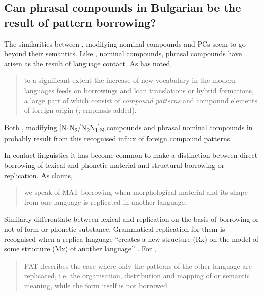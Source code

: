\documentclass[output=paper]{LSP/langsci}
\begin{document}
\subsection{Can phrasal compounds in Bulgarian be the result of pattern borrowing?}\label{sec:bagasheva:5.2}


The similarities between , modifying nominal compounds and PCs seem to go beyond their semantics. Like , nominal compounds, phrasal compounds have arisen as the result of language contact. As \citet[1856]{Ohnheiser2015} has noted,

\begin{quotation}
to a significant extent the increase of new vocabulary in the modern  languages feeds on borrowings and loan translations or hybrid formations, a large part of which consist of \textit{compound patterns} and compound elements of foreign origin (\citealt[1856]{Ohnheiser2015}; emphasis added).
\end{quotation}


Both , modifying [N\textsubscript{1}N\textsubscript{2}/N\textsubscript{2}N\textsubscript{1}]\textsubscript{N} compounds and phrasal nominal compounds in  probably result from this recognised influx of foreign compound patterns. 

In contact linguistics it has become common to make a distinction between direct borrowing of lexical and phonetic material and structural borrowing or  replication. As \citet[15]{Sakel2007}  claims, \begin{quotation}
we speak of MAT-borrowing when morphological material and its  shape from one language is replicated in another language. 
\end{quotation}

Similarly \citet[49]{Heine2006} differentiate between lexical and  replication on the basis of borrowing or not of form or phonetic substance. Grammatical replication for them is recognised when a replica language “creates a new  structure (Rx) on the model of some structure (Mx) of another language” \citep[49]{Heine2006}. For \citet[15]{Sakel2007}, 
\begin{quotation}
PAT describes the case where only the patterns of the other language are replicated, i.e. the organisation, distribution and mapping of  or semantic meaning, while the form itself is not borrowed.
\end{quotation}
\end{document}
